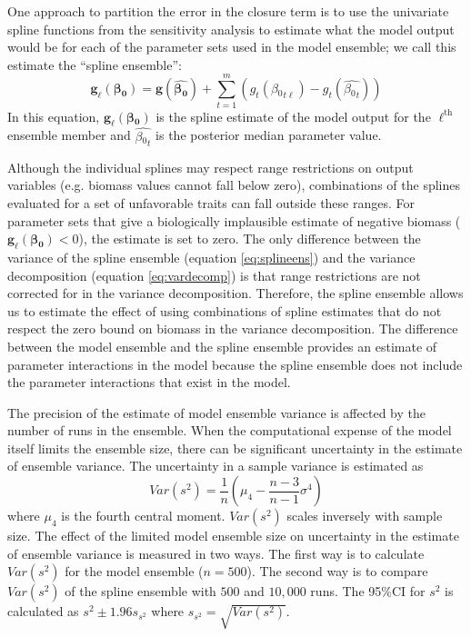 \documentclass[12pt]{article}
\renewcommand{\vec}[1]{\bm{#1}} %
\begin{document}
\begin{flushleft}
\begin{spacing}{1.9}
 One approach to partition the error in the closure term is to use the univariate spline functions from the sensitivity analysis to estimate what the model output would be for each of the parameter sets used in the model ensemble; we call this estimate the ``spline ensemble'':
\begin{equation}\label{eq:splineens}
  \vec{g}_\ell(\vec{\beta{_0}})=\vec{g}(\boldsymbol{\hat{\beta{_0}}}) + \sum_{t=1}^m \left(g_t(\beta{_0}_{t\ell})-g_t(\hat{\beta{_0}_t})\right)
\end{equation}
 In this equation, $\vec{g}_\ell(\vec{\beta{_0}})$ is the spline estimate of the model output for the $\ell^\text{th}$ ensemble member and $\hat{\beta{_0}_t}$ is the posterior median parameter value.

 Although the individual splines may respect range restrictions on output variables (e.g. biomass values cannot fall below zero), combinations of the splines evaluated for a set of unfavorable traits can fall outside these ranges.
 For parameter sets that give a biologically implausible estimate of negative biomass ($\vec{g}_\ell(\vec{\beta{_0}})<0$), the estimate is set to zero. 
 The only difference between the variance of the spline ensemble (equation \ref{eq:splineens}) and the variance decomposition (equation \ref{eq:vardecomp}) is that range restrictions are not corrected for in the variance decomposition.
 Therefore, the spline ensemble allows us to estimate the effect of using combinations of spline estimates that do not respect the zero bound on biomass in the variance decomposition. 
 The difference between the model ensemble and the spline ensemble provides an estimate of parameter interactions in the model because the spline ensemble does not include the parameter interactions that exist in the model.
   

 The precision of the estimate of model ensemble variance is affected by the number of runs in the ensemble. 
 When the computational expense of the model itself limits the ensemble size, there can be significant uncertainty in the estimate of ensemble variance.
 The uncertainty in a sample variance is estimated as 
\begin{equation}\label{eq:varvar}
Var(s^2)=\frac{1}{n}\left(\mu_4-\frac{n-3}{n-1}\sigma^4\right)
\end{equation}
 \citep[][, p 239]{mood1972its} where $\mu_4$ is the fourth central moment. 
 $Var(s^2)$ scales inversely with sample size.
 The effect of the limited model ensemble size on uncertainty in the estimate of ensemble variance is measured in two ways.
 The first way is to calculate $Var(s^2)$ for the model ensemble ($n=500$).
 The second way is to compare $Var(s^2)$ of the spline ensemble with $500$ and $10,000$ runs.
 The 95\%CI for $s^2$ is calculated as $s^2\pm 1.96 s_{s^2}$ where $s_{s^2} = \sqrt{Var(s^2)}$. 


\end{spacing}
\end{flushleft}
\end{document}
